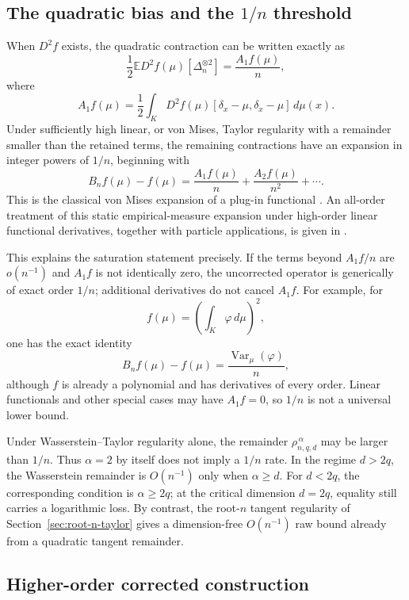 \documentclass[11pt]{article}
\newcommand{\E}{\mathbb E}
\begin{document}
\subsection{The quadratic bias and the \(1/n\) threshold}

When \(D^2f\) exists, the quadratic contraction can be written exactly
as
\[
\frac12\E D^2f(\mu)[\Delta_n^{\otimes2}]
=
\frac{A_1f(\mu)}{n},
\]
where
\[
A_1f(\mu)
=
\frac12
\int_K
D^2f(\mu)
[\delta_x-\mu,\delta_x-\mu]\,d\mu(x).
\]
Under sufficiently high linear, or von Mises, Taylor regularity with a
remainder smaller than the retained terms, the remaining contractions
have an expansion in integer powers of \(1/n\), beginning with
\[
B_nf(\mu)-f(\mu)
=
\frac{A_1f(\mu)}{n}
+
\frac{A_2f(\mu)}{n^2}
+\cdots.
\]
This is the classical von Mises expansion of a plug-in functional
\cite{von-mises,serfling}. An all-order treatment of this static
empirical-measure expansion under high-order linear functional
derivatives, together with particle applications, is given in
\cite{chassagneux-szpruch-tse}.

This explains the saturation statement precisely. If the terms beyond
\(A_1f/n\) are \(o(n^{-1})\) and \(A_1f\) is not identically zero, the
uncorrected operator is generically of exact order \(1/n\); additional
derivatives do not cancel \(A_1f\). For example, for
\[
f(\mu)
=
\left(\int_K\varphi\,d\mu\right)^2,
\]
one has the exact identity
\[
B_nf(\mu)-f(\mu)
=
\frac{\operatorname{Var}_\mu(\varphi)}{n},
\]
although \(f\) is already a polynomial and has derivatives of every
order. Linear functionals and other special cases may have
\(A_1f=0\), so \(1/n\) is not a universal lower bound.

Under Wasserstein--Taylor regularity alone, the remainder
\(\rho_{n,q,d}^{\,\alpha}\) may be larger than \(1/n\). Thus
\(\alpha=2\) by itself does not imply a \(1/n\) rate. In the regime
\(d>2q\), the Wasserstein remainder is \(O(n^{-1})\) only when
\(\alpha\geq d\). For \(d<2q\), the corresponding condition is
\(\alpha\geq2q\); at the critical dimension \(d=2q\), equality still
carries a logarithmic loss. By contrast, the root-\(n\) tangent
regularity of Section~\ref{sec:root-n-taylor} gives a dimension-free
\(O(n^{-1})\) raw bound already from a quadratic tangent remainder.

\subsection{Higher-order corrected construction}
\label{sec:weak-correction}
\end{document}
